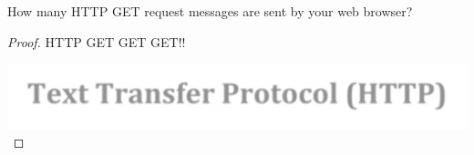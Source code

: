 \documentclass[../../main.tex]{subfiles}
\begin{document}
\begin{wts}
How many HTTP GET request messages are sent by your web browser?  
\end{wts}
\begin{proof}
HTTP GET GET GET!!


\includegraphics[width=\textwidth]{subfiles/images/L5_Manual/L5N2_ DNS & HTTP_PAGE20_11_Image131.png}

\end{proof}
\end{document}
